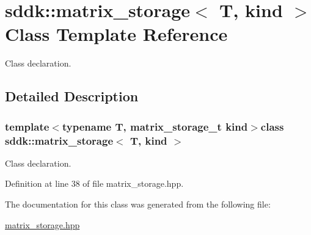 \hypertarget{classsddk_1_1matrix__storage}{}\section{sddk\+:\+:matrix\+\_\+storage$<$ T, kind $>$ Class Template Reference}
\label{classsddk_1_1matrix__storage}


Class declaration.  




\subsection{Detailed Description}
\subsubsection*{template$<$typename T, matrix\+\_\+storage\+\_\+t kind$>$class sddk\+::matrix\+\_\+storage$<$ T, kind $>$}

Class declaration. 

Definition at line 38 of file matrix\+\_\+storage.\+hpp.



The documentation for this class was generated from the following file\+:\begin{DoxyCompactItemize}
\item 
\hyperlink{matrix__storage_8hpp}{matrix\+\_\+storage.\+hpp}\end{DoxyCompactItemize}
